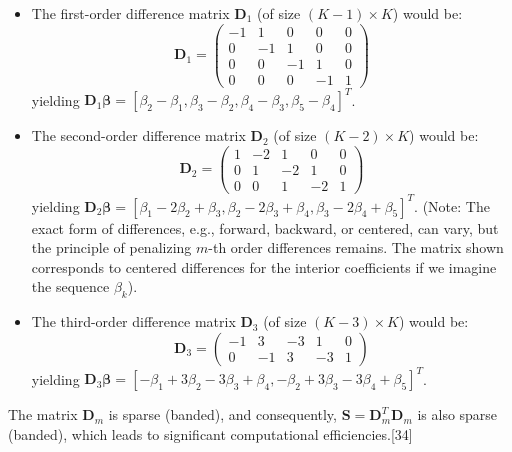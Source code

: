 \documentclass[11pt, a4paper]{article}
\begin{document}
\begin{itemize}
 \item The first-order difference matrix $\mathbf{D}_1$ (of size $(K-1) \times K$) would be:
 \[ \mathbf{D}_1 = \begin{pmatrix} -1 & 1 & 0 & 0 & 0 \\ 0 & -1 & 1 & 0 & 0 \\ 0 & 0 & -1 & 1 & 0 \\ 0 & 0 & 0 & -1 & 1 \end{pmatrix} \]
 yielding $\mathbf{D}_1 \boldsymbol{\beta} = [\beta_2-\beta_1, \beta_3-\beta_2, \beta_4-\beta_3, \beta_5-\beta_4]^T$.

 \item The second-order difference matrix $\mathbf{D}_2$ (of size $(K-2) \times K$) would be:
 \[ \mathbf{D}_2 = \begin{pmatrix} 1 & -2 & 1 & 0 & 0 \\ 0 & 1 & -2 & 1 & 0 \\ 0 & 0 & 1 & -2 & 1 \end{pmatrix} \]
 yielding $\mathbf{D}_2 \boldsymbol{\beta} = [\beta_1-2\beta_2+\beta_3, \beta_2-2\beta_3+\beta_4, \beta_3-2\beta_4+\beta_5]^T$. (Note: The exact form of differences, e.g., forward, backward, or centered, can vary, but the principle of penalizing $m$-th order differences remains. The matrix shown corresponds to centered differences for the interior coefficients if we imagine the sequence $\beta_k$).

 \item The third-order difference matrix $\mathbf{D}_3$ (of size $(K-3) \times K$) would be:
 \[ \mathbf{D}_3 = \begin{pmatrix} -1 & 3 & -3 & 1 & 0 \\ 0 & -1 & 3 & -3 & 1 \end{pmatrix} \]
 yielding $\mathbf{D}_3 \boldsymbol{\beta} = [-\beta_1+3\beta_2-3\beta_3+\beta_4, -\beta_2+3\beta_3-3\beta_4+\beta_5]^T$.
\end{itemize}
The matrix $\mathbf{D}_m$ is sparse (banded), and consequently, $\mathbf{S} = \mathbf{D}_m^T \mathbf{D}_m$ is also sparse (banded), which leads to significant computational efficiencies.[34]
\end{document}
